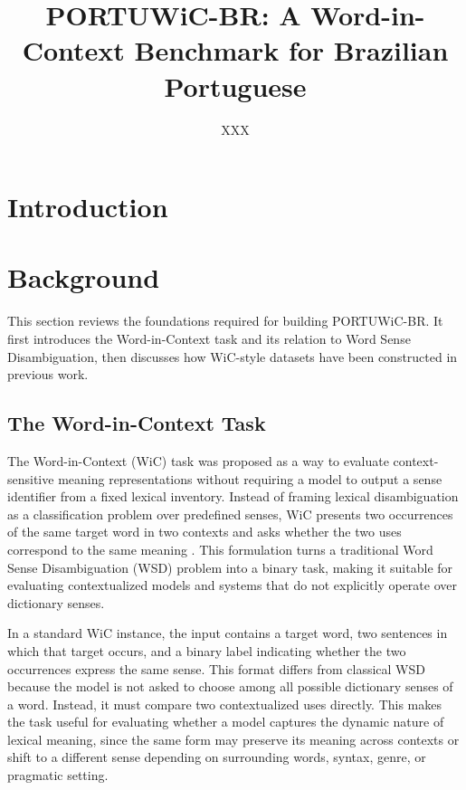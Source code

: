 \documentclass[10pt,a4paper,twocolumn]{article}
\title{PORTUWiC-BR: A Word-in-Context Benchmark for Brazilian Portuguese}
\author{XXX}
\begin{document}
\maketitle

\begin{abstract}
\end{abstract}

\section{Introduction}

\section{Background}
\label{sec:background}

This section reviews the foundations required for building PORTUWiC-BR. It first introduces the Word-in-Context task and its relation to Word Sense Disambiguation, then discusses how WiC-style datasets have been constructed in previous work.

\subsection{The Word-in-Context Task}
\label{subsec:wic-task}

The Word-in-Context (WiC) task was proposed as a way to evaluate context-sensitive meaning representations without requiring a model to output a sense identifier from a fixed lexical inventory. Instead of framing lexical disambiguation as a classification problem over predefined senses, WiC presents two occurrences of the same target word in two contexts and asks whether the two uses correspond to the same meaning \citep{pilehvar2019wic}. This formulation turns a traditional Word Sense Disambiguation (WSD) problem into a binary task, making it suitable for evaluating contextualized models and systems that do not explicitly operate over dictionary senses.

In a standard WiC instance, the input contains a target word, two sentences in which that target occurs, and a binary label indicating whether the two occurrences express the same sense. This format differs from classical WSD because the model is not asked to choose among all possible dictionary senses of a word. Instead, it must compare two contextualized uses directly. This makes the task useful for evaluating whether a model captures the dynamic nature of lexical meaning, since the same form may preserve its meaning across contexts or shift to a different sense depending on surrounding words, syntax, genre, or pragmatic setting.
\end{document}
